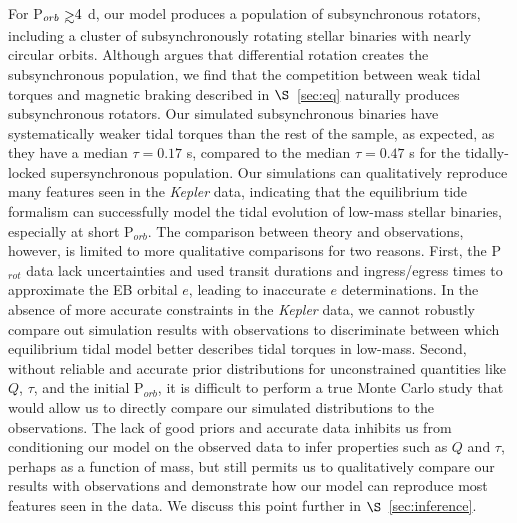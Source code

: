 \documentclass[twocolumn]{aastex61}
\def\gsim{~\rlap{$>$}{\lower 1.0ex\hbox{$\sim$}}}
\newcommand{\kepler}[0]{\textit{Kepler}\xspace}
\begin{document}
For P$_{orb} \gsim 4$ d, our model produces a population of subsynchronous rotators, including a cluster of subsynchronously rotating stellar binaries with nearly circular orbits. Although \citet{Lurie2017} argues that differential rotation creates the subsynchronous population, we find that the competition between weak tidal torques and magnetic braking described in $\S$~\ref{sec:eq} naturally produces subsynchronous rotators.  Our simulated subsynchronous binaries have systematically weaker tidal torques than the rest of the sample, as expected, as they have a median $\tau = 0.17$ s, compared to the median $\tau = 0.47$ s for the tidally-locked supersynchronous population.  
Our simulations can qualitatively reproduce many features seen in the \citet{Lurie2017} \kepler data, indicating that the equilibrium tide formalism can successfully model the tidal evolution of low-mass stellar binaries, especially at short P$_{orb}$. The comparison between theory and observations, however, is limited to more qualitative comparisons for two reasons.  First, the \citet{Lurie2017} P$_{rot}$ data lack uncertainties and \citet{Lurie2017} used transit durations and ingress/egress times to approximate the EB orbital $e$, leading to inaccurate $e$ determinations. In the absence of more accurate constraints in the \citet{Lurie2017} \kepler data, we cannot robustly compare out simulation results with observations to discriminate between which equilibrium tidal model better describes tidal torques in low-mass. Second, without reliable and accurate prior distributions for unconstrained quantities like $Q$, $\tau$, and the initial P$_{orb}$, it is difficult to perform a true Monte Carlo study that would allow us to directly compare our simulated distributions to the observations. The lack of good priors and accurate data inhibits us from conditioning our model on the observed data to infer properties such as $Q$ and $\tau$, perhaps as a function of mass, but still permits us to qualitatively compare our results with observations and demonstrate how our model can reproduce most features seen in the data.  We discuss this point further in $\S$~\ref{sec:inference}.

\end{document}
